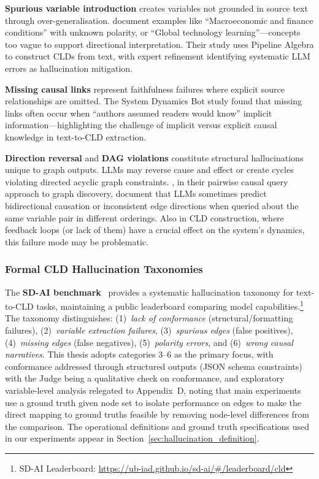 \textbf{Spurious variable introduction} creates variables not grounded in source text through over-generalisation. \citet{reinholtz2025pipelinealgebra} document examples like ``Macroeconomic and finance conditions'' with unknown polarity, or ``Global technology learning''---concepts too vague to support directional interpretation. Their study uses Pipeline Algebra to construct CLDs from text, with expert refinement identifying systematic LLM errors as hallucination mitigation.

\textbf{Missing causal links} represent faithfulness failures where explicit source relationships are omitted. The System Dynamics Bot study found that missing links often occur when ``authors assumed readers would know'' implicit information---highlighting the challenge of implicit versus explicit causal knowledge in text-to-CLD extraction.

\textbf{Direction reversal} and \textbf{DAG violations} constitute structural hallucinations unique to graph outputs. LLMs may reverse cause and effect or create cycles violating directed acyclic graph constraints. \citet{jiralerspong2024efficientcausalgraphdiscovery}, in their pairwise causal query approach to graph discovery, document that LLMs sometimes predict bidirectional causation or inconsistent edge directions when queried about the same variable pair in different orderings. Also in CLD construction, where feedback loops (or lack of them) have a crucial effect on the system's dynamics, this failure mode may be problematic.

\subsubsection{Formal CLD Hallucination Taxonomies}
\label{sec:sd_ai_taxonomy}

The \textbf{SD-AI benchmark}~\citep{schoenberg2025aibuildsdmodels} provides a systematic hallucination taxonomy for text-to-CLD tasks, maintaining a public leaderboard comparing model capabilities.\footnote{SD-AI Leaderboard: \url{https://ub-iad.github.io/sd-ai/\#/leaderboard/cld}} The taxonomy distinguishes: (1)~\textit{lack of conformance} (structural/formatting failures), (2)~\textit{variable extraction failures}, (3)~\textit{spurious edges} (false positives), (4)~\textit{missing edges} (false negatives), (5)~\textit{polarity errors}, and (6)~\textit{wrong causal narratives}. This thesis adopts categories 3--6 as the primary focus, with conformance addressed through structured outputs (JSON schema constraints) with the Judge being a qualitative check on conformance, and exploratory variable-level analysis relegated to Appendix~D, noting that main experiments use a ground truth given node set to isolate performance on edges to make the direct mapping to ground truths feasible by removing node-level differences from the comparison. The operational definitions and ground truth specifications used in our experiments appear in Section~\ref{sec:hallucination_definition}.

